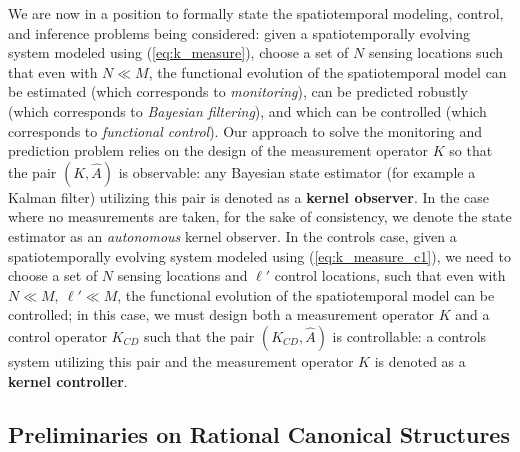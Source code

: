 \documentclass[letterpaper,12pt,peerreviewca,draftcls]{IEEEtran}
\newcommand{\centers}{C}
\newcommand{\centerscontrol}{D}
\newcommand{\empK}{\ensuremath{K}}
\newcommand{\nsamp}{N}
\newcommand{\ncent}{M}
\renewcommand{\eqref}[1]{(\ref{eq:#1})}
\newcommand{\ncontrol}{\ell'}
\newcommand{\empKCD}{\empK_{\centers\centerscontrol}}
\newcommand{\dualop}{A}
\newcommand{\dualopApprox}{\widehat{\dualop}}
\begin{document}
We are now in a position to formally state the spatiotemporal modeling, control, and inference problems being considered: given a spatiotemporally evolving system modeled using \eqref{k_measure}, choose a set of $\nsamp$ sensing locations such that even with $\nsamp\ll \ncent$, the functional evolution of the spatiotemporal model can be estimated (which corresponds to \emph{monitoring}), can be predicted robustly (which corresponds to \emph{Bayesian filtering}), and which can be controlled (which corresponds to \emph{functional control}). Our approach to solve the monitoring and prediction problem relies on the design of the measurement operator $\empK$ so that the pair $(\empK, \dualopApprox)$ is observable: any Bayesian state estimator (for example a Kalman filter) utilizing this pair is denoted as a \textbf{kernel observer}. In the case where no measurements are taken, for the sake of consistency, we denote the state estimator as an \textit{autonomous} kernel observer. In the controls case, given a spatiotemporally evolving system modeled using \eqref{k_measure_c1}, we need to choose a set of $\nsamp$ sensing locations and $\ncontrol$ control locations, such that even with $\nsamp\ll \ncent, \ \ncontrol \ll\ncent$, the functional evolution of the spatiotemporal model can be controlled; in this case, we must design both a measurement operator $\empK$ and a control operator $\empKCD$ such that the pair $(\empKCD, \dualopApprox)$ is controllable: a controls system utilizing this pair and the measurement operator $\empK$ is denoted as a \textbf{kernel controller}.


\subsection{Preliminaries on Rational Canonical Structures}\label{sec_prelim}
\end{document}
